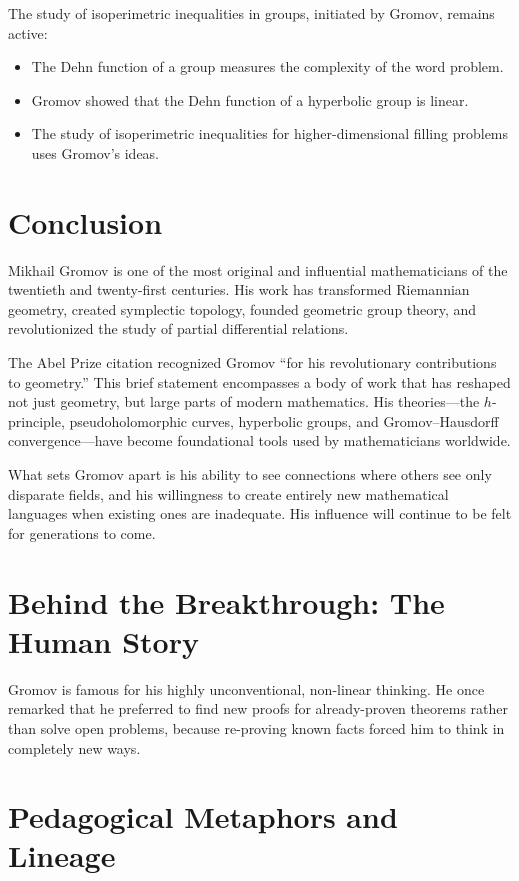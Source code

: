 The study of isoperimetric inequalities in groups, initiated by Gromov, remains active:
\begin{itemize}
\item The Dehn function of a group measures the complexity of the word problem.
\item Gromov showed that the Dehn function of a hyperbolic group is linear.
\item The study of isoperimetric inequalities for higher-dimensional filling problems uses Gromov's ideas.
\end{itemize}

\section{Conclusion}

Mikhail Gromov is one of the most original and influential mathematicians of the twentieth and twenty-first centuries. His work has transformed Riemannian geometry, created symplectic topology, founded geometric group theory, and revolutionized the study of partial differential relations.

The Abel Prize citation recognized Gromov ``for his revolutionary contributions to geometry.'' This brief statement encompasses a body of work that has reshaped not just geometry, but large parts of modern mathematics. His theories---the $h$-principle, pseudoholomorphic curves, hyperbolic groups, and Gromov--Hausdorff convergence---have become foundational tools used by mathematicians worldwide.

What sets Gromov apart is his ability to see connections where others see only disparate fields, and his willingness to create entirely new mathematical languages when existing ones are inadequate. His influence will continue to be felt for generations to come.


\section{Behind the Breakthrough: The Human Story}
Gromov is famous for his highly unconventional, non-linear thinking. He once remarked that he preferred to find new proofs for already-proven theorems rather than solve open problems, because re-proving known facts forced him to think in completely new ways.

\section{Pedagogical Metaphors and Lineage}
